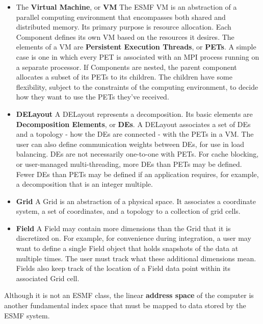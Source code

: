 \begin{itemize}

\item The {\bf Virtual Machine}, or {\bf VM} The ESMF VM is an 
abstraction of a parallel computing environment that encompasses 
both shared and distributed memory.  Its primary purpose 
is resource allocation.  Each Component defines its own VM based on 
the resources it desires.  The elements of a VM are {\bf Persistent 
Execution Threads}, or {\bf PETs}.  A simple case is one in which 
every PET is associated with an MPI process running on a separate
processor.  If Components are nested, the parent component allocates 
a subset of its PETs to its children.  The children have some flexibility, 
subject to the constraints of the computing environment, to decide 
how they want to use the PETs they've received.

\item {\bf DELayout}  A DELayout represents a decomposition.  Its
basic elements are {\bf Decomposition Elements}, or {\bf DEs}.  
A DELayout associates a set of DEs and a topology - how the DEs 
are connected - with the PETs in a VM.  The user can also define 
communication weights between DEs, for use in load balancing.
DEs are not necessarily one-to-one with PETs.  For cache blocking,
or user-managed multi-threading, more DEs than PETs may be defined.
Fewer DEs than PETs may be defined if an application requires,
for example, a decomposition that is an integer multiple.

\item {\bf Grid}  A Grid is an abstraction of a physical space.  
It associates a coordinate system, a set of coordinates, and 
a topology to a collection of grid cells. 

\item {\bf Field}  A Field may contain more dimensions than the 
Grid that it is discretized on.  For example, for convenience 
during integration, a user may want to define a single Field object 
that holds snapshots of the data at multiple times.  The user
must track what these additional dimensions mean.  Fields also 
keep track of the location of a Field data point within its 
associated Grid cell.

\end{itemize}

Although it is not an ESMF class, the linear {\bf address space} 
of the computer is another fundamental index space that must be 
mapped to data stored by the ESMF system.  

